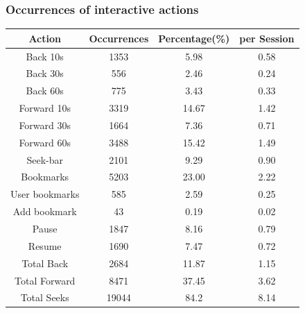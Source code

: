 \documentclass[xcolor=pdftex,dvipsnames,table]{beamer}
\begin{document}
\begin{frame}
    \frametitle{Occurrences of interactive actions}

    {\small
    \begin{tabular}{|c|c|c|c|}
        \hline
        Action & Occurrences & Percentage(\%) & per Session\\
        \hline

        Back 10s        & 1353 & 5.98  & 0.58 \\
        Back 30s        & 556  & 2.46  & 0.24 \\
        Back 60s        & 775  & 3.43  & 0.33 \\
        Forward 10s     & 3319 & 14.67 & 1.42 \\
        Forward 30s     & 1664 & 7.36  & 0.71 \\
        Forward 60s     & 3488 & 15.42 & 1.49 \\
        Seek-bar        & 2101 & 9.29  & 0.90 \\
        Bookmarks       & 5203 & 23.00 & 2.22 \\
        User bookmarks  & 585  & 2.59  & 0.25 \\

        Add bookmark    & 43   & 0.19  & 0.02 \\
        Pause           & 1847 & 8.16  & 0.79 \\ %
        Resume          & 1690 & 7.47  & 0.72 \\ %

        \hline\hline

        Total Back     & 2684 & 11.87 & 1.15 \\
        Total Forward  & 8471 & 37.45 & 3.62 \\
        Total Seeks    & 19044 & 84.2 & 8.14 \\

        \hline
        \end{tabular}
    }

\end{frame}
\end{document}
